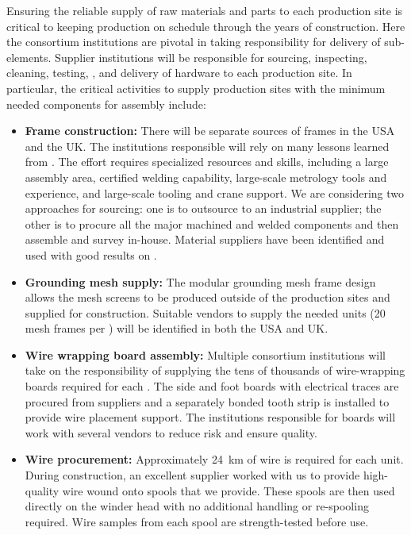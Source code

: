 Ensuring the reliable supply of raw materials and parts to each  production site is critical to keeping  production on schedule through the years of construction. Here the consortium institutions are pivotal in taking responsibility for delivery of  sub-elements. Supplier institutions will be responsible for sourcing, inspecting, cleaning, testing, , and delivery of hardware to each production site.  In particular, the critical activities to supply production sites with the minimum needed  components for assembly include:

\begin{itemize}

\item {\bf Frame construction:} There will be separate sources of frames in the USA and the UK. The institutions responsible will rely on many lessons learned from . The effort requires specialized resources and skills, including a large assembly area, certified welding capability, large-scale metrology tools and experience, and large-scale tooling and crane support. We are considering two approaches for sourcing: one is to outsource to an industrial supplier; the other is to procure all the major machined and welded components and then assemble and survey in-house. Material suppliers have been identified and used with good results on .

\item {\bf Grounding mesh supply:} The modular grounding mesh frame design allows the mesh screens to be produced outside of the  production sites and supplied for  construction.  Suitable vendors to supply the needed units (20 mesh frames per ) will be identified in both the USA and UK.   

\item {\bf Wire wrapping board assembly:} Multiple consortium institutions will take on the responsibility of supplying the tens of thousands of wire-wrapping boards required for each  . The side and foot boards with electrical traces are procured from suppliers and a separately bonded tooth strip is installed to provide wire placement support. 
The institutions responsible for boards will work with several vendors to reduce risk and ensure quality. 


\item {\bf Wire procurement:} %
Approximately \SI{24}{km} of wire is required for %
each unit. During  construction, %
an excellent supplier %
worked with us to provide high-quality wire wound onto spools that we provide. These spools are then used directly on the winder head with no additional handling or re-spooling required. Wire samples from each spool are strength-tested before use.


\end{itemize}
